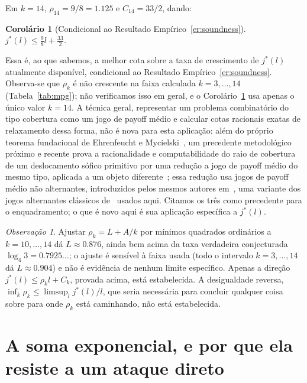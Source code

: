 \documentclass[11pt]{amsart}
\theoremstyle{plain}
\newtheorem{corollary}[theorem]{Corol\'ario}
\theoremstyle{definition}
\theoremstyle{remark}
\newtheorem{remark}[theorem]{Observa\c{c}\~ao}
\begin{document}
Em $k=14$, $\rho_{14} = 9/8 = 1.125$ e $C_{14}=33/2$, dando:

\begin{corollary}[Condicional ao Resultado Empírico~\ref{er:soundness}]
\label{cor:mpgbound}
$j^*(l) \le \tfrac98 l + \tfrac{33}2$.
\end{corollary}

Essa é, ao que sabemos, a melhor cota sobre a taxa de crescimento de $j^*(l)$ atualmente
disponível, condicional ao Resultado Empírico~\ref{er:soundness}. Observa-se que $\rho_k$ é não
crescente na faixa calculada $k=3,\dots,14$ (Tabela~\ref{tab:mpg}); não verificamos isso em geral,
e o Corolário~\ref{cor:mpgbound} usa apenas o único valor $k=14$. A técnica geral, representar um
problema combinatório do tipo cobertura como um jogo de payoff médio e calcular cotas racionais
exatas de relaxamento dessa forma, não é nova para esta aplicação: além do próprio teorema
fundacional de Ehrenfeucht e Mycielski~\cite{ehrenfeuchtmycielski1979}, um precedente metodológico
próximo e recente prova a racionalidade e computabilidade do raio de cobertura de um deslocamento
sófico primitivo por uma redução a jogo de payoff médio do mesmo tipo, aplicada a um objeto
diferente~\cite{meyerovitchyoung2026}; essa redução usa jogos de payoff médio não alternantes,
introduzidos pelos mesmos autores em~\cite{meyerovitchyoung2025nonalt}, uma variante dos jogos
alternantes clássicos de~\cite{ehrenfeuchtmycielski1979} usados aqui. Citamos os três como
precedente para o enquadramento; o que é novo aqui é sua aplicação específica a $j^*(l)$.

\begin{remark}
Ajustar $\rho_k = L + A/k$ por mínimos quadrados ordinários a $k=10,\dots,14$ dá $L\approx0.876$,
ainda bem acima da taxa verdadeira conjecturada $\log_4 3 = 0.7925\ldots$; o ajuste é sensível à
faixa usada (todo o intervalo $k=3,\dots,14$ dá $L\approx0.904$) e não é evidência de nenhum limite
específico. Apenas a direção $j^*(l)\le\rho_k l + C_k$, provada acima, está estabelecida. A
desigualdade reversa, $\inf_k \rho_k \le \limsup_l j^*(l)/l$, que seria necessária para concluir
qualquer coisa sobre para onde $\rho_k$ está caminhando, não está estabelecida.
\end{remark}

\section{A soma exponencial, e por que ela resiste a um ataque direto}
\label{sec:gapA}
\end{document}
